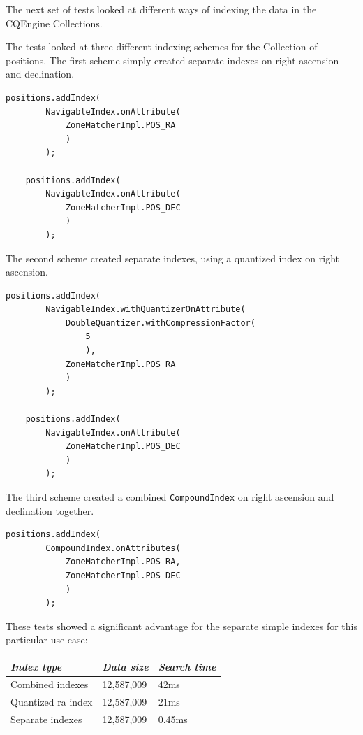 \documentclass{article}
\newcommand{\cqengine} {CQEngine\xspace}
\begin{document}
The next set of tests looked at different ways of indexing the data in the \cqengine Collections.

The tests looked at three different indexing schemes for the Collection of positions. The first scheme simply created separate indexes on right ascension and declination.

\begin{lstlisting}[style=Java]
    positions.addIndex(
        NavigableIndex.onAttribute(
            ZoneMatcherImpl.POS_RA
            )
        );

    positions.addIndex(
        NavigableIndex.onAttribute(
            ZoneMatcherImpl.POS_DEC
            )
        );
\end{lstlisting}

The second scheme created separate indexes, using a quantized index on right ascension.

\begin{lstlisting}[style=Java]
    positions.addIndex(
        NavigableIndex.withQuantizerOnAttribute(
            DoubleQuantizer.withCompressionFactor(
                5
                ),
            ZoneMatcherImpl.POS_RA
            )
        );

    positions.addIndex(
        NavigableIndex.onAttribute(
            ZoneMatcherImpl.POS_DEC
            )
        );
\end{lstlisting}

The third scheme created a combined \texttt{CompoundIndex} on right ascension and declination together.

\begin{lstlisting}[style=Java]
    positions.addIndex(
        CompoundIndex.onAttributes(
            ZoneMatcherImpl.POS_RA,
            ZoneMatcherImpl.POS_DEC
            )
        );
\end{lstlisting}

These tests showed a significant advantage for the separate simple indexes for this particular use case:

\begin{table}[h]
\centering
\begin{tabular}{|l|l|l|}
\hline
\textit{Index type} & \textit{Data size} & \textit{Search time} \\ \hline
Combined indexes & 12,587,009 & 42ms \\ \hline
Quantized ra index & 12,587,009 & 21ms \\ \hline
Separate indexes & 12,587,009 & 0.45ms \\ \hline
\end{tabular}
\end{table}
\end{document}

